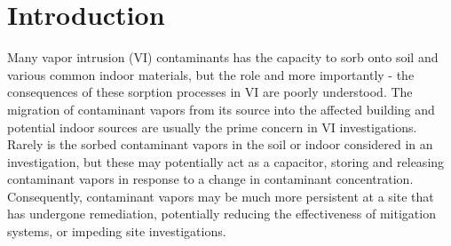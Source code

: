 \begin{comment}

What is the message of the paper?

Sorbed contaminants can significantly delay changes in concentration in the indoor air and the soil-gas depending on the particular soil and/or indoor materials found.
This has consequences if one is for instance interested in mitigating or remediating a VI site as sorption may significantly impede this effort.
It also has consequences for rooting out indoor contaminant sources as:
1. Even after ventilation and/or removing potential indoor sources, there may still be contaminant vapors being released from various materials.
2. It may decrease the effectiveness of applying the CPM.

What is the new result/contribution that you want to describe?

This study presents some new sorption information for TCE and runs never-done-before simulations that investigate the potential role of sorption in VI and VI investigations.

What do you want to convince people of?

1. Take indoor materials into account and perhaps removing or covering up exposed materials that have a high sorption capacity.
2. Take it into consideration that contaminants vapors may emanate from soils for a long time, since they potentially have such a large sorption capacity - almost acting a source in of themselves. E.g. that remediation or mitigation effort may be impeded by this.
3. Perhaps desorbing soil/indoor material samples to determine how significant sorption might be warranted.

\end{comment}

\section{Introduction}\label{sec:intro}

Many vapor intrusion (VI) contaminants has the capacity to sorb onto soil and various common indoor materials, but the role and more importantly - the consequences of these sorption processes in VI are poorly understood\cite{meininghaus_diffusion_2000,meininghaus_diffusion_2002,tillman_review_2005}.
The migration of contaminant vapors from its source into the affected building and potential indoor sources are usually the prime concern in VI investigations.
Rarely is the sorbed contaminant vapors in the soil or indoor considered in an investigation, but these may potentially act as a capacitor, storing and releasing contaminant vapors in response to a change in contaminant concentration.
Consequently, contaminant vapors may be much more persistent at a site that has undergone remediation, potentially reducing the effectiveness of mitigation systems, or impeding site investigations.\par

